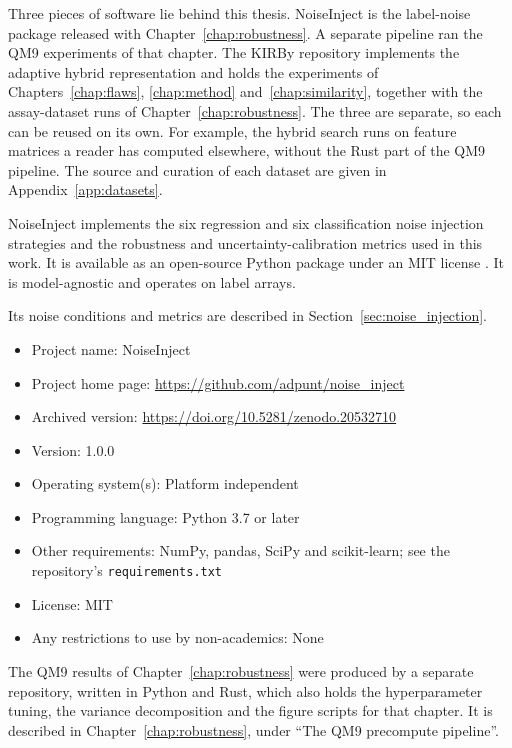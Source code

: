 Three pieces of software lie behind this thesis. NoiseInject is the label-noise package released with Chapter~\ref{chap:robustness}. A separate pipeline ran the QM9 experiments of that chapter. The KIRBy repository implements the adaptive hybrid representation and holds the experiments of Chapters~\ref{chap:flaws}, \ref{chap:method} and~\ref{chap:similarity}, together with the assay-dataset runs of Chapter~\ref{chap:robustness}. The three are separate, so each can be reused on its own. For example, the hybrid search runs on feature matrices a reader has computed elsewhere, without the Rust part of the QM9 pipeline. The source and curation of each dataset are given in Appendix~\ref{app:datasets}.

NoiseInject implements the six regression and six classification noise injection strategies and the robustness and uncertainty-calibration metrics used in this work. It is available as an open-source Python package under an MIT license \citep{noiseinject}. It is model-agnostic and operates on label arrays.

Its noise conditions and metrics are described in Section~\ref{sec:noise_injection}.

\begin{itemize}
    \item Project name: NoiseInject
    \item Project home page: \url{https://github.com/adpunt/noise_inject}
    \item Archived version: \url{https://doi.org/10.5281/zenodo.20532710}
    \item Version: 1.0.0
    \item Operating system(s): Platform independent
    \item Programming language: Python 3.7 or later
    \item Other requirements: NumPy, pandas, SciPy and scikit-learn; see the repository's \texttt{requirements.txt}
    \item License: MIT
    \item Any restrictions to use by non-academics: None
\end{itemize}

The QM9 results of Chapter~\ref{chap:robustness} were produced by a separate repository, written in Python and Rust, which also holds the hyperparameter tuning, the variance decomposition and the figure scripts for that chapter. It is described in Chapter~\ref{chap:robustness}, under ``The QM9 precompute pipeline''.

